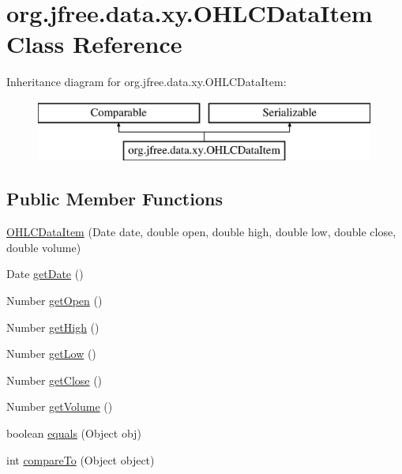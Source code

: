 \hypertarget{classorg_1_1jfree_1_1data_1_1xy_1_1_o_h_l_c_data_item}{}\section{org.\+jfree.\+data.\+xy.\+O\+H\+L\+C\+Data\+Item Class Reference}
\label{classorg_1_1jfree_1_1data_1_1xy_1_1_o_h_l_c_data_item}
Inheritance diagram for org.\+jfree.\+data.\+xy.\+O\+H\+L\+C\+Data\+Item\+:\begin{figure}[H]
\begin{center}
\leavevmode
\includegraphics[height=2.000000cm]{classorg_1_1jfree_1_1data_1_1xy_1_1_o_h_l_c_data_item}
\end{center}
\end{figure}
\subsection*{Public Member Functions}
\begin{DoxyCompactItemize}
\item 
\mbox{\hyperlink{classorg_1_1jfree_1_1data_1_1xy_1_1_o_h_l_c_data_item_abdd312cf4c7f91297195f24862c2d666}{O\+H\+L\+C\+Data\+Item}} (Date date, double open, double high, double low, double close, double volume)
\item 
Date \mbox{\hyperlink{classorg_1_1jfree_1_1data_1_1xy_1_1_o_h_l_c_data_item_ada6c019c57e40731a78631e60641aa2d}{get\+Date}} ()
\item 
Number \mbox{\hyperlink{classorg_1_1jfree_1_1data_1_1xy_1_1_o_h_l_c_data_item_a282f1cbd1d5d893c78a427091cc8b656}{get\+Open}} ()
\item 
Number \mbox{\hyperlink{classorg_1_1jfree_1_1data_1_1xy_1_1_o_h_l_c_data_item_a26f41f1bbf6b66a1c4b584d735294c1a}{get\+High}} ()
\item 
Number \mbox{\hyperlink{classorg_1_1jfree_1_1data_1_1xy_1_1_o_h_l_c_data_item_a0a283571998a3b63d65523a67fe83940}{get\+Low}} ()
\item 
Number \mbox{\hyperlink{classorg_1_1jfree_1_1data_1_1xy_1_1_o_h_l_c_data_item_a336769e124f6f206aa8749bd93c60c54}{get\+Close}} ()
\item 
Number \mbox{\hyperlink{classorg_1_1jfree_1_1data_1_1xy_1_1_o_h_l_c_data_item_ae70052475c3a64442bc59a8780f68d49}{get\+Volume}} ()
\item 
boolean \mbox{\hyperlink{classorg_1_1jfree_1_1data_1_1xy_1_1_o_h_l_c_data_item_a0d85c5c782d4fa4ec8ad8fd3ddb5df5c}{equals}} (Object obj)
\item 
int \mbox{\hyperlink{classorg_1_1jfree_1_1data_1_1xy_1_1_o_h_l_c_data_item_acdd858d92e12bcaa6143deb42c47ed8d}{compare\+To}} (Object object)
\end{DoxyCompactItemize}


